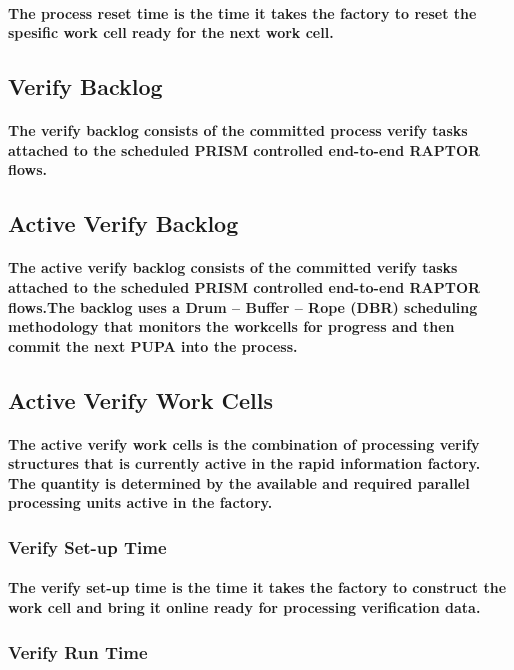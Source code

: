 \paragraph{The process reset time is the time it takes the factory to reset the spesific work cell ready for the next work cell.}
\subsection{Verify Backlog}
\paragraph{The verify backlog consists of the committed process verify tasks attached to the scheduled PRISM controlled end-to-end RAPTOR flows.}
\subsection{Active Verify Backlog}
\paragraph{The active verify backlog consists of the committed verify tasks attached to the scheduled PRISM controlled end-to-end RAPTOR flows.The backlog uses a Drum – Buffer – Rope (DBR) scheduling methodology \cite{daniel1997scheduling} that monitors the workcells for progress and then commit the next PUPA into the process.}
\subsection{Active Verify Work Cells}
\paragraph{The active verify work cells is the combination of processing verify structures that is currently active in the rapid information factory. The quantity is determined by the available and required parallel processing units active in the factory.}
\subsubsection{Verify Set-up Time}
\paragraph{The verify set-up time is the time it takes the factory to construct the work cell and bring it online ready for processing verification data.}
\subsubsection{Verify Run Time}
